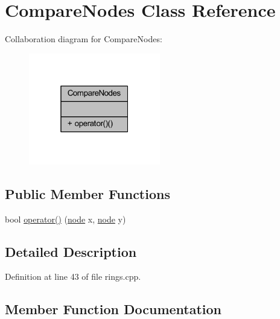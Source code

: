\hypertarget{class_compare_nodes}{}\section{Compare\+Nodes Class Reference}
\label{class_compare_nodes}


Collaboration diagram for Compare\+Nodes\+:\nopagebreak
\begin{figure}[H]
\begin{center}
\leavevmode
\includegraphics[width=163pt]{class_compare_nodes__coll__graph}
\end{center}
\end{figure}
\subsection*{Public Member Functions}
\begin{DoxyCompactItemize}
\item 
bool \mbox{\hyperlink{class_compare_nodes_a8e0a0e6085d127c981736d579e398e09}{operator()}} (\mbox{\hyperlink{classnode}{node}} x, \mbox{\hyperlink{classnode}{node}} y)
\end{DoxyCompactItemize}


\subsection{Detailed Description}


Definition at line 43 of file rings.\+cpp.



\subsection{Member Function Documentation}
\mbox{\label{class_compare_nodes_a8e0a0e6085d127c981736d579e398e09}} 
